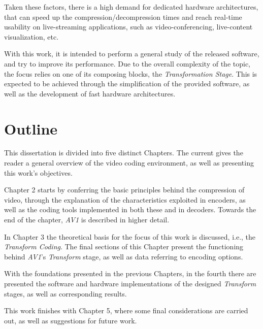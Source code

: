 Taken these factors, there is a high demand for dedicated hardware architectures, that can speed up the compression/decompression times and reach real-time usability on live-streaming applications, such as video-conferencing, live-content visualization, etc.

With this work, it is intended to perform a general study of the released software, and try to improve its performance. Due to the overall complexity of the topic, the focus relies on one of its composing blocks, the \emph{Transformation Stage}. This is expected to be achieved through the simplification of the provided software, as well as the development of fast hardware architectures.

\section{Outline}

This dissertation is divided into five distinct Chapters. The current gives the reader a general overview of the video coding environment, as well as presenting this work's objectives.

Chapter 2 starts by conferring the basic principles behind the compression of video, through the explanation of the characteristics exploited in encoders, as well as the coding tools implemented in both these and in decoders. Towards the end of the chapter, \emph{AV1} is described in higher detail.

In Chapter 3 the theoretical basis for the focus of this work is discussed, i.e., the \emph{Transform Coding}. The final sections of this Chapter present the functioning behind \emph{AV1}'s \emph{Transform} stage, as well as data referring to encoding options.

With the foundations presented in the previous Chapters, in the fourth there are presented the software and hardware implementations of the designed \emph{Transform} stages, as well as corresponding results.

This work finishes with Chapter 5, where some final considerations are carried out, as well as suggestions for future work.

\clearpage
\printbibliography[heading=subbibliography]
